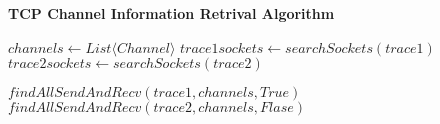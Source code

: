 \begin{algorithm}[H]
\DontPrintSemicolon
\caption{{\bf TCP Channel Information Retrival Algorithm} \label{TCPAlgorithm1}}
 $channels \leftarrow List\langle Channel\rangle $\; 
 $trace1sockets \leftarrow searchSockets\left( trace1 \right)  $\;
 $trace2sockets \leftarrow searchSockets\left( trace2 \right)  $\;



 $findAllSendAndRecv \left( trace1,channels,True \right) $\;
 $findAllSendAndRecv \left( trace2,channels,Flase \right) $\;
\end{algorithm} 
  
